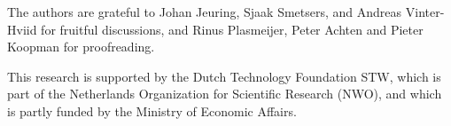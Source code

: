 
The authors are grateful to Johan Jeuring, Sjaak Smetsers, and Andreas Vinter-Hviid for fruitful discussions,
and Rinus Plasmeijer, Peter Achten and Pieter Koopman for proofreading.

This research is supported by the Dutch Technology Foundation STW, which is part
of the Netherlands Organization for Scientific Research (NWO), and which is
partly funded by the Ministry of Economic Affairs.
